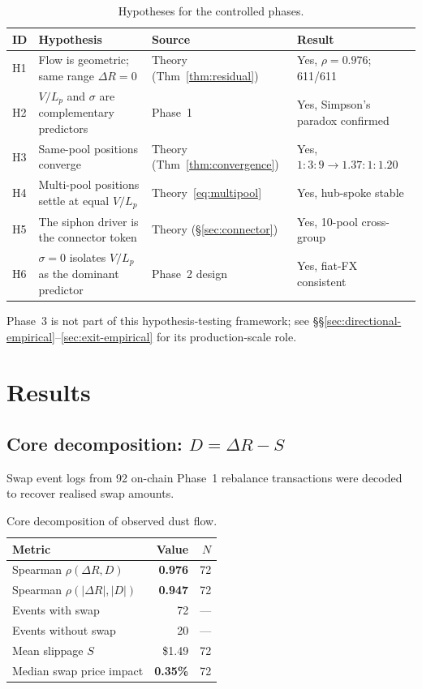 \documentclass[11pt,a4paper]{article}
\theoremstyle{plain}
\begin{document}
\begin{table}[H]
\centering
\caption{Hypotheses for the controlled phases.}
\label{tab:hypotheses}
\begin{tabular}{@{}lL{6.4cm}lL{4cm}@{}}
\toprule
ID & Hypothesis & Source & Result \\
\midrule
H1 & Flow is geometric; same range $\Delta R = 0$ & Theory (Thm~\ref{thm:residual}) & Yes, $\rho = 0.976$; 611/611 \\
H2 & $V/L_p$ and $\sigma$ are complementary predictors & Phase~1 & Yes, Simpson's paradox confirmed \\
H3 & Same-pool positions converge & Theory (Thm~\ref{thm:convergence}) & Yes, $1{:}3{:}9 \to 1.37{:}1{:}1.20$ \\
H4 & Multi-pool positions settle at equal $V/L_p$ & Theory~\eqref{eq:multipool} & Yes, hub-spoke stable \\
H5 & The siphon driver is the connector token & Theory (\S\ref{sec:connector}) & Yes, 10-pool cross-group \\
H6 & $\sigma = 0$ isolates $V/L_p$ as the dominant predictor & Phase~2 design & Yes, fiat-FX consistent \\
\bottomrule
\end{tabular}
\end{table}

\noindent Phase~3 is not part of this hypothesis-testing framework; see \S\S\ref{sec:directional-empirical}--\ref{sec:exit-empirical} for its production-scale role.

\section{Results}\label{sec:results}

\subsection{Core decomposition: \texorpdfstring{$D = \Delta R - S$}{D = Delta R - S}}\label{sec:decomposition}

Swap event logs from 92 on-chain Phase~1 rebalance transactions were decoded to recover realised swap amounts.

\begin{table}[H]
\centering
\caption{Core decomposition of observed dust flow.}
\label{tab:decomposition}
\begin{tabular}{@{}lrr@{}}
\toprule
Metric & Value & $N$ \\
\midrule
Spearman $\rho(\Delta R, D)$     & \textbf{0.976} & 72 \\
Spearman $\rho(|\Delta R|, |D|)$ & \textbf{0.947} & 72 \\
Events with swap                 & 72             & --- \\
Events without swap              & 20             & --- \\
Mean slippage $S$                & \$1.49         & 72 \\
Median swap price impact         & \textbf{0.35\%} & 72 \\
\bottomrule
\end{tabular}
\end{table}
\end{document}
